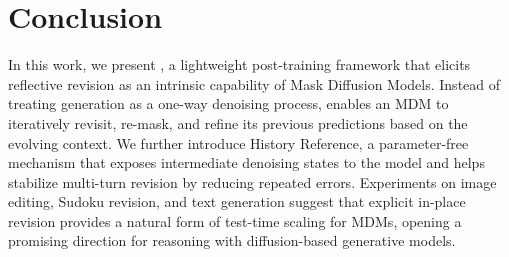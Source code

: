 \section{Conclusion}
\label{sec:conclusion}

In this work, we present \methodfull, a lightweight post-training framework that elicits reflective revision as an intrinsic capability of Mask Diffusion Models. Instead of treating generation as a one-way denoising process, \method enables an MDM to iteratively revisit, re-mask, and refine its previous predictions based on the evolving context. We further introduce History Reference, a parameter-free mechanism that exposes intermediate denoising states to the model and helps stabilize multi-turn revision by reducing repeated errors. Experiments on image editing, Sudoku revision, and text generation suggest that explicit in-place revision provides a natural form of test-time scaling for MDMs, opening a promising direction for reasoning with diffusion-based generative models.